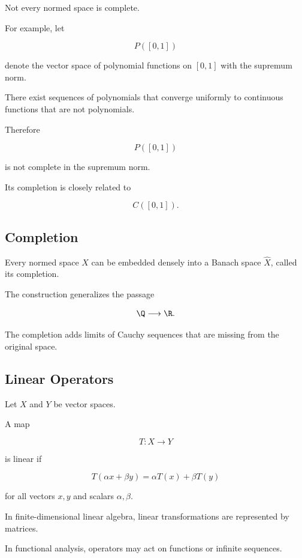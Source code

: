 Not every normed space is complete.

For example, let

\[
P([0,1])
\]

denote the vector space of polynomial functions on \([0,1]\) with the
supremum norm.

There exist sequences of polynomials that converge uniformly to
continuous functions that are not polynomials.

Therefore

\[
\boxed{
P([0,1])
}
\]

is not complete in the supremum norm.

Its completion is closely related to

\[
C([0,1]).
\]

\subsection{Completion}
\label{subsec:completion-normed-space}

Every normed space \(X\) can be embedded densely into a Banach space
\(\widehat{X}\), called its completion.

The construction generalizes the passage

\[
\Q\longrightarrow\R.
\]

The completion adds limits of Cauchy sequences that are missing from the
original space.

\subsection{Linear Operators}
\label{subsec:linear-operators-functional}

Let \(X\) and \(Y\) be vector spaces.

A map

\[
T:X\to Y
\]

is linear if

\[
\boxed{
T(\alpha x+\beta y)
=
\alpha T(x)+\beta T(y)
}
\]

for all vectors \(x,y\) and scalars \(\alpha,\beta\).

In finite-dimensional linear algebra, linear transformations are
represented by matrices.

In functional analysis, operators may act on functions or infinite
sequences.

